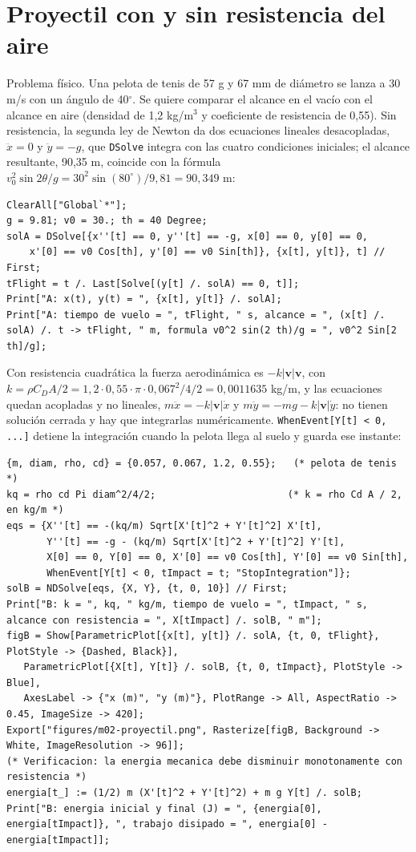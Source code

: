 \documentclass[10pt,openany]{book}
\begin{document}
\section{Proyectil con y sin resistencia del aire}

Problema físico. Una pelota de tenis de 57 g y 67 mm de diámetro se lanza a 30 m/s con un ángulo de 40\(^\circ\). Se quiere comparar el alcance en el vacío con el alcance en aire (densidad de 1,2 kg/m\(^3\) y coeficiente de resistencia de 0,55). Sin resistencia, la segunda ley de Newton da dos ecuaciones lineales desacopladas, \(\ddot x = 0\) y \(\ddot y = -g\), que \texttt{DSolve} integra con las cuatro condiciones iniciales; el alcance resultante, 90,35 m, coincide con la fórmula \(v_0^{2}\sin 2\theta/g = 30^2\sin(80^\circ)/9{,}81 = 90{,}349\) m:
\begin{lstlisting}[style=studium]
ClearAll["Global`*"];
g = 9.81; v0 = 30.; th = 40 Degree;
solA = DSolve[{x''[t] == 0, y''[t] == -g, x[0] == 0, y[0] == 0,
    x'[0] == v0 Cos[th], y'[0] == v0 Sin[th]}, {x[t], y[t]}, t] // First;
tFlight = t /. Last[Solve[(y[t] /. solA) == 0, t]];
Print["A: x(t), y(t) = ", {x[t], y[t]} /. solA];
Print["A: tiempo de vuelo = ", tFlight, " s, alcance = ", (x[t] /. solA) /. t -> tFlight, " m, formula v0^2 sin(2 th)/g = ", v0^2 Sin[2 th]/g];
\end{lstlisting}
Con resistencia cuadrática la fuerza aerodinámica es \(-k|\mathbf{v}|\mathbf{v}\), con \(k = \rho C_D A/2 = 1{,}2\cdot 0{,}55\cdot\pi\cdot 0{,}067^2/4/2 = 0{,}0011635\) kg/m, y las ecuaciones quedan acopladas y no lineales, \(m\ddot x = -k|\mathbf{v}|\dot x\) y \(m\ddot y = -mg - k|\mathbf{v}|\dot y\): no tienen solución cerrada y hay que integrarlas numéricamente. \texttt{WhenEvent[Y[t] < 0, ...]} detiene la integración cuando la pelota llega al suelo y guarda ese instante:
\begin{lstlisting}[style=studium]
{m, diam, rho, cd} = {0.057, 0.067, 1.2, 0.55};   (* pelota de tenis *)
kq = rho cd Pi diam^2/4/2;                       (* k = rho Cd A / 2, en kg/m *)
eqs = {X''[t] == -(kq/m) Sqrt[X'[t]^2 + Y'[t]^2] X'[t],
       Y''[t] == -g - (kq/m) Sqrt[X'[t]^2 + Y'[t]^2] Y'[t],
       X[0] == 0, Y[0] == 0, X'[0] == v0 Cos[th], Y'[0] == v0 Sin[th],
       WhenEvent[Y[t] < 0, tImpact = t; "StopIntegration"]};
solB = NDSolve[eqs, {X, Y}, {t, 0, 10}] // First;
Print["B: k = ", kq, " kg/m, tiempo de vuelo = ", tImpact, " s, alcance con resistencia = ", X[tImpact] /. solB, " m"];
figB = Show[ParametricPlot[{x[t], y[t]} /. solA, {t, 0, tFlight}, PlotStyle -> {Dashed, Black}],
   ParametricPlot[{X[t], Y[t]} /. solB, {t, 0, tImpact}, PlotStyle -> Blue],
   AxesLabel -> {"x (m)", "y (m)"}, PlotRange -> All, AspectRatio -> 0.45, ImageSize -> 420];
Export["figures/m02-proyectil.png", Rasterize[figB, Background -> White, ImageResolution -> 96]];
(* Verificacion: la energia mecanica debe disminuir monotonamente con resistencia *)
energia[t_] := (1/2) m (X'[t]^2 + Y'[t]^2) + m g Y[t] /. solB;
Print["B: energia inicial y final (J) = ", {energia[0], energia[tImpact]}, ", trabajo disipado = ", energia[0] - energia[tImpact]];
\end{lstlisting}
\end{document}
